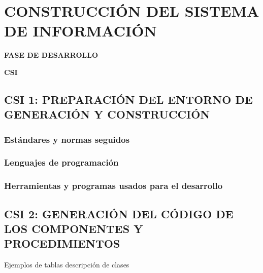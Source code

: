 \newpage
\chapter{CONSTRUCCIÓN DEL SISTEMA DE INFORMACIÓN}
	\vspace{2cm}	
	\begin{center}
	{\Large \textbf{FASE DE DESARROLLO} \par}
	\end{center}
	\vspace{5cm}
	
	\begin{center}
	\Huge \textbf{CSI}\par
	\end{center}

\newpage


\section{CSI 1: PREPARACIÓN DEL ENTORNO DE GENERACIÓN Y CONSTRUCCIÓN}

\subsection{Estándares y normas seguidos}


\subsection{Lenguajes de programación}


\subsection{Herramientas y programas usados para el desarrollo}


\newpage
\section{CSI 2: GENERACIÓN DEL CÓDIGO DE LOS COMPONENTES Y PROCEDIMIENTOS}

\textcolor[rgb]{0.65,0.16,0}{Ejemplos de tablas descripción de clases}

